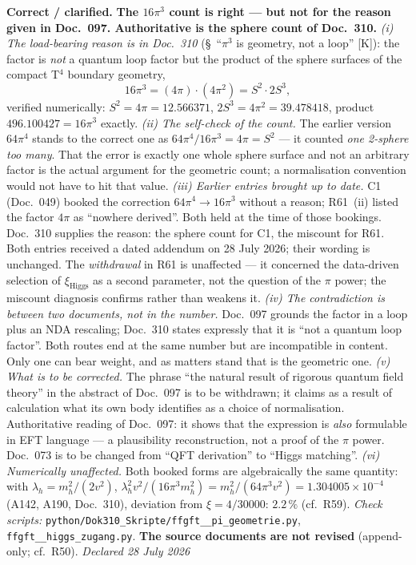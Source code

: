 \smallskip\noindent\textbf{Correct / clarified.}\quad
\textbf{The $16\pi^3$ count is right --- but not for the reason given in
Doc.~097. Authoritative is the sphere count of Doc.~310.}
\emph{(i) The load-bearing reason is in Doc.~310}
(\S~\enquote{$\pi^3$ is geometry, not a loop} [K]): the factor is
\emph{not} a quantum loop factor but the product of the sphere surfaces
of the compact T$^4$ boundary geometry,
\[
  16\pi^3 = (4\pi)\cdot(4\pi^2) = S^2 \cdot 2S^3 ,
\]
verified numerically: $S^2 = 4\pi = 12.566371$,
$2S^3 = 4\pi^2 = 39.478418$, product $496.100427 = 16\pi^3$ exactly.
\emph{(ii) The self-check of the count.} The earlier version $64\pi^4$
stands to the correct one as $64\pi^4/16\pi^3 = 4\pi = S^2$ --- it
counted \emph{one 2-sphere too many}. That the error is exactly one
whole sphere surface and not an arbitrary factor is the actual argument
for the geometric count; a normalisation convention would not have to
hit that value.
\emph{(iii) Earlier entries brought up to date.} C1 (Doc.~049) booked the
correction $64\pi^4 \to 16\pi^3$ without a reason; R61~(ii) listed the
factor $4\pi$ as \enquote{nowhere derived}. Both held at the time of
those bookings. Doc.~310 supplies the reason: the sphere count for C1,
the miscount for R61. Both entries received a dated addendum on 28 July
2026; their wording is unchanged. The \emph{withdrawal} in R61 is
unaffected --- it concerned the data-driven selection of
$\xi_\text{Higgs}$ as a second parameter, not the question of the $\pi$
power; the miscount diagnosis confirms rather than weakens it.
\emph{(iv) The contradiction is between two documents, not in the
number.} Doc.~097 grounds the factor in a loop plus an NDA rescaling;
Doc.~310 states expressly that it is \enquote{not a quantum loop
factor}. Both routes end at the same number but are incompatible in
content. Only one can bear weight, and as matters stand that is the
geometric one.
\emph{(v) What is to be corrected.} The phrase \enquote{the natural
result of rigorous quantum field theory} in the abstract of Doc.~097 is
to be withdrawn; it claims as a result of calculation what its own body
identifies as a choice of normalisation. Authoritative reading of
Doc.~097: it shows that the expression is \emph{also} formulable in EFT
language --- a plausibility reconstruction, not a proof of the $\pi$
power. Doc.~073 is to be changed from \enquote{QFT derivation} to
\enquote{Higgs matching}.
\emph{(vi) Numerically unaffected.} Both booked forms are algebraically
the same quantity: with $\lambda_h = m_h^2/(2v^2)$,
$\lambda_h^2 v^2/(16\pi^3 m_h^2) = m_h^2/(64\pi^3 v^2)
= 1.304005\times10^{-4}$ (A142, A190, Doc.~310), deviation from
$\xi = 4/30000$: $2.2\,\%$ (cf.\ R59).
\emph{Check scripts:}
\texttt{python/\allowbreak Dok310\_\allowbreak Skripte/\allowbreak ffgft\_\_\allowbreak pi\_\allowbreak geometrie.py},
\texttt{ffgft\_\_\allowbreak higgs\_\allowbreak zugang.py}.
\textbf{The source documents are not revised}
(append-only; cf.\ R50). \emph{Declared 28 July 2026}

